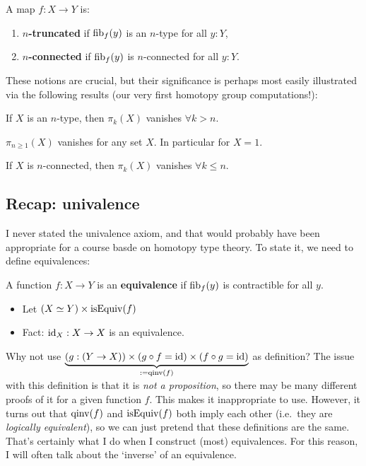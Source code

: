 \documentclass[10pt,oneside,leqno,openright]{memoir}
\begin{document}
\begin{definition}
    A map $f : X \to Y$ is:
    \begin{enumerate}
        \item \textbf{$n$-truncated} if $\operatorname{fib}_f(y)$ is an $n$-type for all $y:Y$,
        \item \textbf{$n$-connected} if $\operatorname{fib}_f(y)$ is $n$-connected for all $y:Y$.
    \end{enumerate}
\end{definition}
%
These notions are crucial, but their significance is perhaps most easily illustrated via the following results (our very first homotopy group computations!):
\begin{proposition}
  If $X$ is an $n$-type, then $\pi_{k}(X)$ vanishes $\forall k>n$.
\end{proposition}
\begin{corollary}
  $\pi_{n \geq 1}(X)$ vanishes for any set $X$. In particular for $X = 1$.
\end{corollary}
\begin{proposition}
  If $X$ is $n$-connected, then $\pi_{k}(X)$ vanishes $\forall k\leq n$.
\end{proposition}

\subsection*{Recap: univalence}
I never stated the univalence axiom, and that would probably have been appropriate for a course basde on homotopy type theory.
%
To state it, we need to define equivalences:
\begin{definition}
  A function $f:X\to Y$ is an \textbf{equivalence} if $\operatorname{fib}_f(y)$ is contractible for all $y$.
\end{definition}
\begin{itemize}
\item Let $(X\simeq Y) \times \operatorname{isEquiv}(f)$
\item Fact: $\operatorname{id}_X : X \to X$ is an equivalence.
\end{itemize}
\begin{remark}\label{rmk:qinv}
  Why not use $\underset{:= \operatorname{qinv}(f)}{\underbrace{(g : (Y \to X)) \times (g \circ f = \operatorname{id}) \times (f \circ g = \operatorname{id})}}$ as definition? The issue with this definition is that it is \emph{not a proposition}, so there may be many different proofs of it for a given function $f$. This makes it inappropriate to use. However, it turns out that  $\operatorname{qinv}(f)$ and $\operatorname{isEquiv}(f)$ both imply each other (i.e.\ they are \emph{logically equivalent}), so we can just pretend that these definitions are the same. That's certainly what I do when I construct (most) equivalences. For this reason, I will often talk about the `inverse' of an equivalence.
\end{remark}
\end{document}
